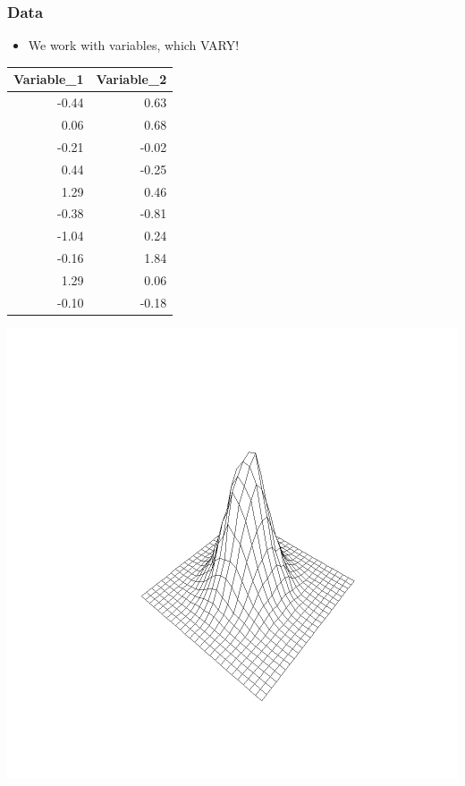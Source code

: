 \documentclass[xcolor=x11names,compress]{beamer}\usepackage[]{graphicx}\usepackage[]{color}
\makeatletter
\def\maxwidth{ %
  \ifdim\Gin@nat@width>\linewidth
    \linewidth
  \else
    \Gin@nat@width
  \fi
}
\newenvironment{knitrout}{}{} %
\renewcommand{\(}{\begin{columns}}
\renewcommand{\)}{\end{columns}}
\newcommand{\<}[1]{\begin{column}{#1}}
\renewcommand{\>}{\end{column}}
\makeatother
\begin{document}
\begin{frame}
\frametitle{Data}
\begin{itemize}
\item We work with variables, which VARY!
\end{itemize}
\begin{multicols}{2}
\begin{table}[ht]
\centering
\begin{tabular}{rr}
  \hline
Variable\_1 & Variable\_2 \\ 
  \hline
-0.44 & 0.63 \\ 
  0.06 & 0.68 \\ 
  -0.21 & -0.02 \\ 
  0.44 & -0.25 \\ 
  1.29 & 0.46 \\ 
  -0.38 & -0.81 \\ 
  -1.04 & 0.24 \\ 
  -0.16 & 1.84 \\ 
  1.29 & 0.06 \\ 
  -0.10 & -0.18 \\ 
   \hline
\end{tabular}
\end{table}

\columnbreak
\begin{knitrout}
\color{fgcolor}
\includegraphics[width=\maxwidth]{figure/var4-1} 

\end{knitrout}
\end{multicols}
\end{frame}
\end{document}
